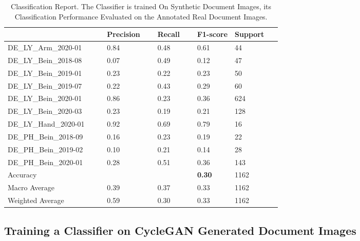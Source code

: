 \begin{center}
\begin{table}[H]
    \begin{center}
    \begin{tabular}{p{0.22\linewidth} p{0.10\linewidth} p{0.10\linewidth} p{0.10\linewidth} p{0.10\linewidth}} 
        \toprule
            & Precision & Recall & F1-score & Support\\[0.0ex] 
        \midrule
        DE\_LY\_Arm\_2020-01 & 0.84 & 0.48 & 0.61 & 44\\[0.0ex]
        \midrule
        DE\_LY\_Bein\_2018-08 & 0.07 & 0.49 & 0.12 & 47\\[0.0ex]
        \midrule
        DE\_LY\_Bein\_2019-01 & 0.23 & 0.22 & 0.23 & 50\\[0.0ex]
        \midrule
        DE\_LY\_Bein\_2019-07 & 0.22 & 0.43 & 0.29 & 60\\[0.0ex]
        \midrule
        DE\_LY\_Bein\_2020-01 & 0.86 & 0.23 & 0.36 & 624\\[0.0ex]
        \midrule
        DE\_LY\_Bein\_2020-03 & 0.23 & 0.19 & 0.21 & 128\\[0.0ex]
        \midrule
        DE\_LY\_Hand\_2020-01 & 0.92 & 0.69 & 0.79 & 16\\[0.0ex]
        \midrule
        DE\_PH\_Bein\_2018-09 & 0.16 & 0.23 & 0.19 & 22\\[0.0ex]
        \midrule
        DE\_PH\_Bein\_2019-02 & 0.10 & 0.21 & 0.14 & 28\\[0.0ex]
        \midrule
        DE\_PH\_Bein\_2020-01 & 0.28 & 0.51 & 0.36 & 143\\[0.0ex]
        \midrule
        \midrule
        Accuracy              &      &      & \bf{0.30} & 1162\\[0.0ex]
        Macro Average             & 0.39 & 0.37 & 0.33 & 1162\\[0.0ex]
        Weighted Average          & 0.59 & 0.30 & 0.33 & 1162\\[0.0ex]
        \bottomrule
    \end{tabular}
    \caption{Classification Report. The Classifier is trained On Synthetic Document Images, its Classification Performance Evaluated on the Annotated Real Document Images.}
    \label{table:SyntheticClassificationReport}
    \end{center}
\end{table}
\end{center}



\subsection{Training a Classifier on \ac{CycleGAN} Generated Document Images}














